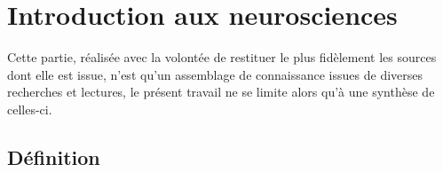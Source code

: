 \documentclass[12pt,fleqn,oneside,openany]{book} %
\begin{document}
\section{Introduction aux neurosciences} \label{sec:introNeuro}
\begin{remark}
	Cette partie, réalisée avec la volontée de restituer le plus fidèlement les sources dont elle est issue, n'est qu'un assemblage de connaissance issues de diverses recherches et lectures, le présent travail ne se limite alors qu'à une synthèse de celles-ci. 
\end{remark}

\subsection[Définition]{Définition \cite{wikineuro}} \label{ssec:definition} %
\end{document}
